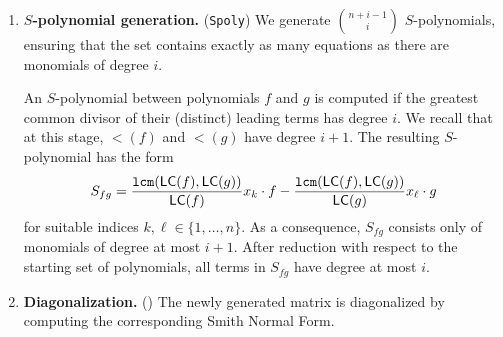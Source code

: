 \begin{enumerate}
    \item \textbf{$S$-polynomial generation.} (\texttt{Spoly})
    We generate $\binom{n+i-1}{i}$ $S$-polynomials, ensuring that the set contains exactly as many equations as there are monomials of degree $i$.

    An $S$-polynomial between polynomials $f$ and $g$ is computed if the greatest common divisor of their (distinct) leading terms has degree $i$.
    We recall that at this stage, $\lt(f)$ and $\lt(g)$ have degree $i+1$.
    The resulting $S$-polynomial has the form  
    \begin{equation}\label{eq:spoly}
        S_{fg} = \frac{\texttt{lcm}(\mathsf{LC}(f), \mathsf{LC}(g))}{\mathsf{LC}(f)} x_k\cdot f - \frac{\texttt{lcm}(\mathsf{LC}(f), \mathsf{LC}(g))}{\mathsf{LC}(g)} x_\ell \cdot g
    \end{equation}
    for suitable indices $k,\ell \in \{1,\dots,n\}$.
    As a consequence, $S_{fg}$ consists only of monomials of degree at most $i+1$.
    After reduction with respect to the starting set of polynomials, all terms in $S_{fg}$ have degree at most $i$.
    \item \textbf{Diagonalization.} (\algdiag)
    The newly generated matrix is diagonalized by computing the corresponding Smith Normal Form.  
  \end{enumerate}

  \begin{algorithm}[t!]
\caption{Main Algorithm}\label{alg:alg}
\begin{algorithmic}[1]
 
     
     
\EndFor{}
 
\end{algorithmic}
\end{algorithm}

